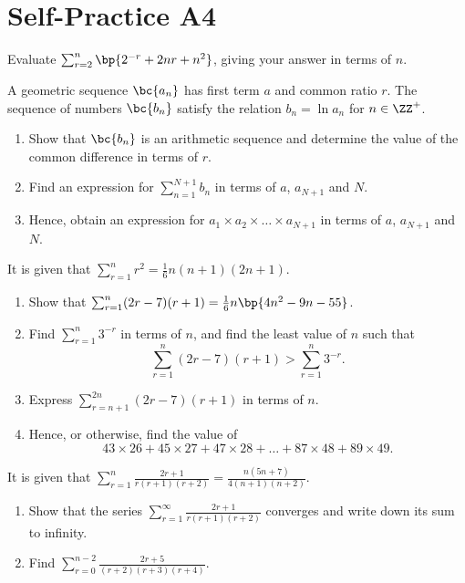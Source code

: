 \section{Self-Practice A4}

\begin{problem}
    Evaluate $\sum_{r = 2}^n \bp{2^{-r} + 2nr + n^2}$, giving your answer in terms of $n$.
\end{problem}

\begin{problem}
    A geometric sequence $\bc{a_n}$ has first term $a$ and common ratio $r$. The sequence of numbers $\bc{b_n}$ satisfy the relation $b_n = \ln{a_n}$ for $n \in \ZZ^+$.

    \begin{enumerate}
        \item Show that $\bc{b_n}$ is an arithmetic sequence and determine the value of the common difference in terms of $r$.
        \item Find an expression for $\sum_{n = 1}^{N+1} b_n$ in terms of $a$, $a_{N+1}$ and $N$.
        \item Hence, obtain an expression for $a_1 \times a_2 \times \dots \times a_{N+1}$ in terms of $a$, $a_{N+1}$ and $N$.
    \end{enumerate}
\end{problem}

\begin{problem}
    It is given that $\sum_{r = 1}^n r^2 = \frac16 n(n+1)(2n+1)$.

    \begin{enumerate}
        \item Show that $\sum_{r = 1}^n (2r-7)(r+1) = \frac16 n\bp{4n^2 - 9n - 55}$.
        \item Find $\sum_{r = 1}^n 3^{-r}$ in terms of $n$, and find the least value of $n$ such that \[\sum_{r = 1}^n (2r-7)(r + 1) > \sum_{r = 1}^n 3^{-r}.\]
        \item Express $\sum_{r = n + 1}^{2n} (2r-7)(r+1)$ in terms of $n$.
        \item Hence, or otherwise, find the value of \[43\times26 + 45\times27 + 47\times28 + \dots +87\times48 + 89\times49.\]
    \end{enumerate}
\end{problem}

\begin{problem}
    It is given that $\sum_{r = 1}^n \frac{2r+1}{r(r+1)(r+2)} = \frac{n(5n+7)}{4(n+1)(n+2)}$.

    \begin{enumerate}
        \item Show that the series $\sum_{r = 1}^\infty \frac{2r+1}{r(r+1)(r+2)}$ converges and write down its sum to infinity.
        \item Find $\sum_{r = 0}^{n-2} \frac{2r+5}{(r+2)(r+3)(r+4)}$.
    \end{enumerate}
\end{problem}
